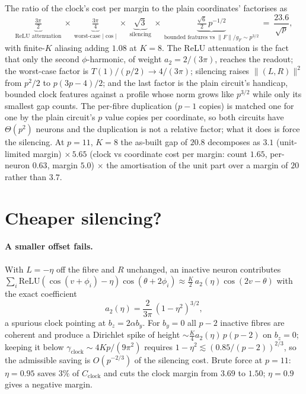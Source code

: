 \documentclass[11pt]{article}
\theoremstyle{remark}
\newcommand{\relu}{\mathrm{ReLU}}
\newcommand{\cost}{C}
\newcommand{\gam}{\gamma}
\newcommand{\abs}[1]{\lvert #1 \rvert}
\newcommand{\norm}[1]{\lVert #1 \rVert}
\begin{document}
The ratio of the clock's cost per margin to the plain coordinates' factorises as
\[
\underbrace{\tfrac{3\pi}{2}}_{\text{ReLU attenuation}}\ \times\ \underbrace{\tfrac{3\pi}{4}}_{\text{worst-case } \abs{\cos}}\ \times\
\underbrace{\sqrt3}_{\text{silencing}}\ \times\ \underbrace{\tfrac{\sqrt6}{2}\, p^{-1/2}}_{\text{bounded features vs } \norm{F}/g_F \sim p^{3/2}}
\ =\ \frac{23.6}{\sqrt p},
\]
with finite-$K$ aliasing adding $1.08$ at $K = 8$. The ReLU attenuation is the fact that only the second $\phi$-harmonic, of weight
$a_2 = 2/(3\pi)$, reaches the readout; the worst-case factor is $T(1)/(p/2) \to 4/(3\pi)$; silencing raises $\norm{(L,R)}^2$ from
$p^2/2$ to $p(3p-4)/2$; and the last factor is the plain circuit's handicap, bounded clock features against a profile whose norm grows
like $p^{3/2}$ while only its smallest gap counts. The per-fibre duplication ($p-1$ copies) is matched one for one by the plain
circuit's $p$ value copies per coordinate, so both circuits have $\Theta(p^2)$ neurons and the duplication is not a relative factor;
what it does is force the silencing. At $p = 11$, $K = 8$ the as-built gap of $20.8$ decomposes as $3.1$ (unit-limited margin)
$\times\, 5.65$ (clock vs coordinate cost per margin: count $1.65$, per-neuron $0.63$, margin $5.0$) $\times$ the amortisation of the
unit part over a margin of $20$ rather than $3.7$.

\section{Cheaper silencing?}

\paragraph{A smaller offset fails.} With $L = -\eta$ off the fibre and $R$ unchanged, an inactive neuron contributes
$\sum_i \relu(\cos(v+\phi_i) - \eta)\cos(\theta + 2\phi_i) \approx \tfrac{K}{2}\, a_2(\eta)\cos(2v - \theta)$ with the exact coefficient
\[
a_2(\eta) = \frac{2}{3\pi}\,(1 - \eta^2)^{3/2},
\]
a spurious clock pointing at $b_z = 2\alpha b_y$. For $b_y = 0$ all $p-2$ inactive fibres are coherent and produce a Dirichlet spike of
height $\sim \tfrac{K}{4} a_2(\eta)\, p(p-2)$ on $b_z = 0$; keeping it below $\gam_{\mathrm{clock}} \sim 4Kp/(9\pi^2)$ requires
$1 - \eta^2 \lesssim (0.85/(p-2))^{2/3}$, so the admissible saving is $O(p^{-2/3})$ of the silencing cost. Brute force at $p = 11$:
$\eta = 0.95$ saves $3\%$ of $\cost_{\mathrm{clock}}$ and cuts the clock margin from $3.69$ to $1.50$; $\eta = 0.9$ gives a negative margin.
\end{document}
